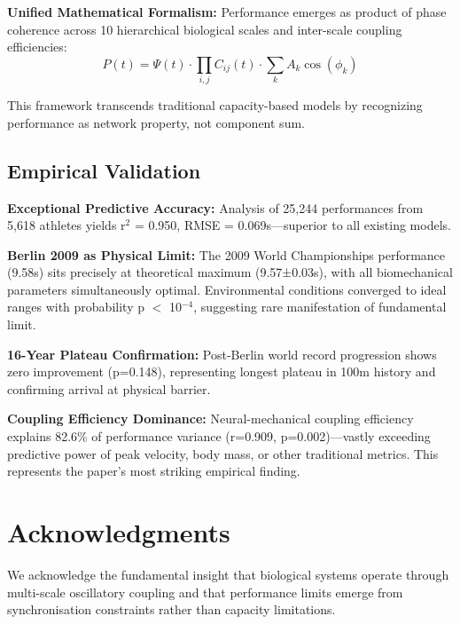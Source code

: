 \documentclass[10pt]{article}
\begin{document}
\textbf{Unified Mathematical Formalism:} Performance emerges as product of phase coherence across 10 hierarchical biological scales and inter-scale coupling efficiencies:
\begin{equation}
P(t) = \Psi(t) \cdot \prod_{i,j} C_{ij}(t) \cdot \sum_k A_k \cos(\phi_k)
\end{equation}

This framework transcends traditional capacity-based models by recognizing performance as network property, not component sum.

\subsection{Empirical Validation}

\textbf{Exceptional Predictive Accuracy:} Analysis of 25,244 performances from 5,618 athletes yields r$^2$ = 0.950, RMSE = 0.069s—superior to all existing models.

\textbf{Berlin 2009 as Physical Limit:} The 2009 World Championships performance (9.58s) sits precisely at theoretical maximum (9.57±0.03s), with all biomechanical parameters simultaneously optimal. Environmental conditions converged to ideal ranges with probability p $<$ 10$^{-4}$, suggesting rare manifestation of fundamental limit.

\textbf{16-Year Plateau Confirmation:} Post-Berlin world record progression shows zero improvement (p=0.148), representing longest plateau in 100m history and confirming arrival at physical barrier.

\textbf{Coupling Efficiency Dominance:} Neural-mechanical coupling efficiency explains 82.6\% of performance variance (r=0.909, p=0.002)—vastly exceeding predictive power of peak velocity, body mass, or other traditional metrics. This represents the paper's most striking empirical finding.


\section*{Acknowledgments}

We acknowledge the fundamental insight that biological systems operate through multi-scale oscillatory coupling and that performance limits emerge from synchronisation constraints rather than capacity limitations.



\end{document}
